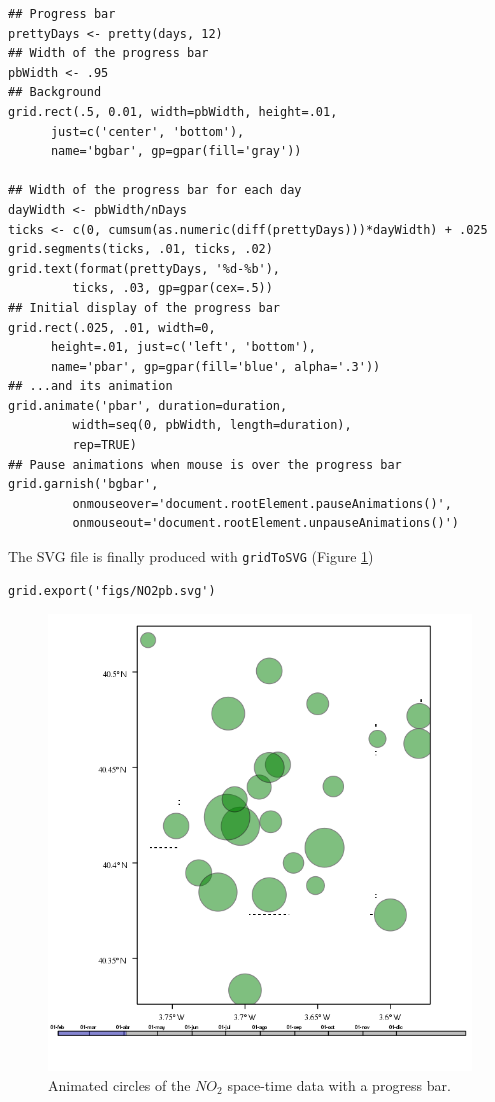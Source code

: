 \documentclass[smallroyalvopaper]{memoir}
\begin{document}
\lstset{language=R,numbers=none}
\begin{lstlisting}
## Progress bar
prettyDays <- pretty(days, 12)
## Width of the progress bar
pbWidth <- .95
## Background
grid.rect(.5, 0.01, width=pbWidth, height=.01,
	  just=c('center', 'bottom'),
	  name='bgbar', gp=gpar(fill='gray'))

## Width of the progress bar for each day
dayWidth <- pbWidth/nDays
ticks <- c(0, cumsum(as.numeric(diff(prettyDays)))*dayWidth) + .025
grid.segments(ticks, .01, ticks, .02)
grid.text(format(prettyDays, '%d-%b'),
		 ticks, .03, gp=gpar(cex=.5))
## Initial display of the progress bar
grid.rect(.025, .01, width=0,
	  height=.01, just=c('left', 'bottom'),
	  name='pbar', gp=gpar(fill='blue', alpha='.3'))
## ...and its animation
grid.animate('pbar', duration=duration,
	     width=seq(0, pbWidth, length=duration),
	     rep=TRUE)
## Pause animations when mouse is over the progress bar
grid.garnish('bgbar',
	     onmouseover='document.rootElement.pauseAnimations()',
	     onmouseout='document.rootElement.unpauseAnimations()')
\end{lstlisting}

The SVG file is finally produced with \texttt{gridToSVG} (Figure \ref{fig:NO2pb})


\lstset{language=R,numbers=none}
\begin{lstlisting}
grid.export('figs/NO2pb.svg')
\end{lstlisting}

\begin{figure}
  \centering
  \includegraphics[width=\textwidth]{figs/NO2pb.png}
  \caption{Animated circles of the $NO_2$ space-time data with a progress bar.}
  \label{fig:NO2pb}
\end{figure}
\end{document}
